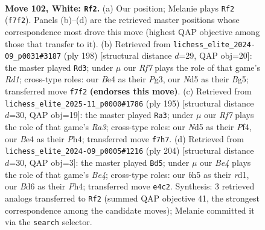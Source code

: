 \documentclass[11pt]{article}
\begin{document}
\clearpage

\begin{figure}[p]\centering
\begin{subfigure}{0.46\textwidth}\centering
\resizebox{\linewidth}{!}{%
\newchessgame
\chessboard[
  setfen={3k4/5R2/PP1B4/3N3b/4B3/1K5p/8/6r1 w - - 3 102},
  showmover=false,
  pgfstyle=straightmove, color=movearrow, markmove={f7-f2}
]}
\caption{}
\end{subfigure}\hfill
\begin{subfigure}{0.46\textwidth}\centering
\resizebox{\linewidth}{!}{%
\newchessgame
\chessboard[
  setfen={4k3/8/4r3/2P3Bp/1K6/5bP1/8/3R4 w - - 15 100},
  showmover=false,
  pgfstyle=straightmove, color=movearrow, markmove={d1-d3}
]}
\caption{}
\end{subfigure}
\\[4pt]
\begin{subfigure}{0.46\textwidth}\centering
\resizebox{\linewidth}{!}{%
\newchessgame
\chessboard[
  setfen={2B5/8/r7/2k4b/5p1p/2N4P/5K2/8 b - - 5 98},
  showmover=false,
  pgfstyle=straightmove, color=movearrow, markmove={a6-a3}
]}
\caption{}
\end{subfigure}\hfill
\begin{subfigure}{0.46\textwidth}\centering
\resizebox{\linewidth}{!}{%
\newchessgame
\chessboard[
  setfen={3k4/1R4P1/3K4/7p/4B2P/8/8/3r4 w - - 3 103},
  showmover=false,
  pgfstyle=straightmove, color=movearrow, markmove={e4-d5}
]}
\caption{}
\end{subfigure}
\caption{\textbf{Move 102, White: \texttt{Rf2}.} (a) Our position; Melanie plays \texttt{Rf2} (\texttt{f7f2}). Panels (b)--(d) are the retrieved master positions whose correspondence most drove this move (highest QAP objective among those that transfer to it). (b) Retrieved from \texttt{lichess\_elite\_2024-09\_p0031\#3187} (ply 198) [structural distance $d$=29, QAP obj=20]: the master played \texttt{Rd3}; under $\mu$ our \emph{Rf7} plays the role of that game's \emph{Rd1}; cross-type roles: our \emph{B}e4 as their \emph{P}g3, our \emph{N}d5 as their \emph{B}g5; transferred move \texttt{f7f2} \textbf{(endorses this move)}. (c) Retrieved from \texttt{lichess\_elite\_2025-11\_p0000\#1786} (ply 195) [structural distance $d$=30, QAP obj=19]: the master played \texttt{Ra3}; under $\mu$ our \emph{Rf7} plays the role of that game's \emph{Ra3}; cross-type roles: our \emph{N}d5 as their \emph{P}f4, our \emph{B}e4 as their \emph{P}h4; transferred move \texttt{f7h7}. (d) Retrieved from \texttt{lichess\_elite\_2024-09\_p0005\#1216} (ply 204) [structural distance $d$=30, QAP obj=3]: the master played \texttt{Bd5}; under $\mu$ our \emph{Be4} plays the role of that game's \emph{Be4}; cross-type roles: our \emph{b}h5 as their \emph{r}d1, our \emph{B}d6 as their \emph{P}h4; transferred move \texttt{e4c2}. Synthesis: 3 retrieved analogs transferred to \texttt{Rf2} (summed QAP objective 41, the strongest correspondence among the candidate moves); Melanie committed it via the \texttt{search} selector.}
\label{fig:thought-m202}
\end{figure}
\end{document}
